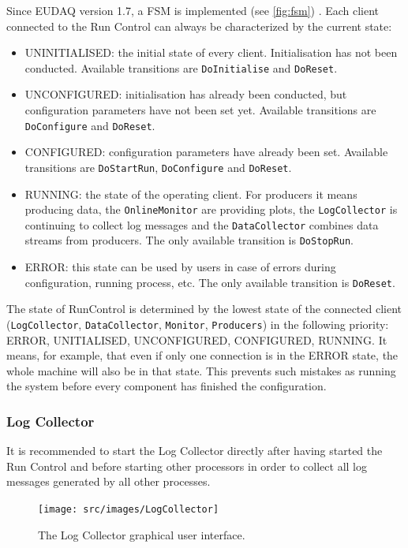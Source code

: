 Since EUDAQ version 1.7, a \gls{FSM} is implemented (see \autoref{fig:fsm}) \cite{Shirokova:2016}.
Each client connected to the Run Control can always be characterized by the current state:

\begin{itemize}
\item UNINITIALISED: the initial state of every client. Initialisation has not been conducted. Available transitions are \texttt{DoInitialise} and \texttt{DoReset}.%
\item UNCONFIGURED: initialisation has already been conducted, but configuration parameters have not been set yet. Available transitions are \texttt{DoConfigure} and \texttt{DoReset}.
\item CONFIGURED: configuration parameters have already been set. Available transitions are \texttt{DoStartRun}, \texttt{DoConfigure} and \texttt{DoReset}.
\item RUNNING: the state of the operating client. For producers it means producing data, the \texttt{OnlineMonitor} are providing plots, the \texttt{LogCollector} is continuing to collect log messages and the \texttt{DataCollector} combines data streams from producers. The only available transition is \texttt{DoStopRun}.
\item ERROR: this state can be used by users in case of errors during configuration, running process, etc. The only available transition is \texttt{DoReset}.
\end{itemize}

The state of RunControl is determined by the lowest state of the connected client (\texttt{LogCollector}, \texttt{DataCollector}, \texttt{Monitor}, \texttt{Producers}) in the following priority: ERROR, UNITIALISED, UNCONFIGURED, CONFIGURED, RUNNING. It means, for example, that even if only one connection is in the ERROR state, the whole machine will also be in that state. This prevents such mistakes as running the system before every component has finished the configuration.

\subsubsection{Log Collector}
\label{sec:logcollector}
It is recommended to start the Log Collector directly after having started the Run Control and before starting other processors in order to collect all log messages generated by all other processes.

\begin{figure}[htb]
  \begin{center}
    \texttt{[image: src/images/LogCollector]}
    \caption{The Log Collector graphical user interface.}
    \label{fig:LogCollector}
  \end{center}
\end{figure}

